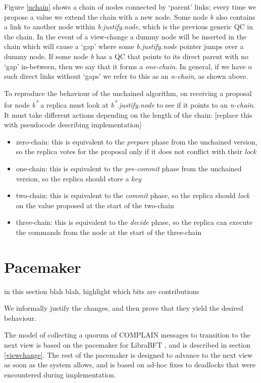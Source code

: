 Figure \ref{nchain} shows a chain of nodes connected by `parent' links; every time we propose a value we extend the chain with a new node. Some node \textit{b} also contains a link to another node within \textit{b.justify.node}, which is the previous generic QC in the chain. In the event of a view-change a dummy node will be inserted in the chain which will cause a `gap' where some \textit{b.justify.node} pointer jumps over a dummy node. If some node \textit{b} has a QC that points to its direct parent with no `gap' in-between, then we say that it forms a \textit{one-chain}. In general, if we have $n$ such direct links without `gaps' we refer to this as an \textit{n-chain}, as shown above.

To reproduce the behaviour of the unchained algorithm, on receiving a proposal for node \textit{b\textsuperscript{*}} a replica must look at \textit{b\textsuperscript{*}.justify.node} to see if it points to an \textit{n-chain}. It must take different actions depending on the length of the chain:
[replace this with pseudocode describing implementation]
\begin{itemize}
\item zero-chain: this is equivalent to the \textit{prepare} phase from the unchained version, so the replica votes for the proposal only if it does not conflict with their \textit{lock}
\item one-chain: this is equivalent to the \textit{pre-commit} phase from the unchained version, so the replica should store a \textit{key}
\item two-chain: this is equivalent to the \textit{commit} phase, so the replica should \textit{lock} on the value proposed at the start of the two-chain
\item three-chain: this is equivalent to the \textit{decide} phase, so the replica can execute the commands from the node at the start of the three-chain
\end{itemize}

\section{Pacemaker} \label{pacemaker}
in this section blah blah, highlight which bits are contributions

We informally justify the changes, and then prove that they yield the desired behaviour.

The model of collecting a quorum of COMPLAIN messages to transition to the next view is based on the pacemaker for LibraBFT \cite{baudet_state_nodate}, and is described in section \ref{viewchange}. The rest of the pacemaker is designed to advance to the next view as soon as the system allows, and is based on ad-hoc fixes to deadlocks that were encountered during implementation.

